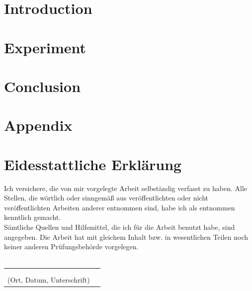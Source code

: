 \documentclass[a4paper,12pt,oneside]{article}
\begin{document}
    \newpage
    

    \tableofcontents
    
    \newpage
    \pagestyle{fancy}
    
    
    \listoffigures
    \newpage
    
    \listoftables
    \newpage
    
  
    
    \section{Introduction}\label{introduction}  
     
    \newpage

    \section{Experiment}
    
    \newpage
    
    \newpage
    
    \newpage
    
    \section{Conclusion}\label{conclusion}  
     
    
    

    \newpage
    \setcounter{section}{0} 
    \renewcommand*\thesection{\Alph{section}}

    \section{Appendix}\label{appendix}
    



    \newpage
        
    \pagestyle{empty}
    \section{Eidesstattliche Erklärung}
    
    Ich versichere, die von mir vorgelegte Arbeit selbständig verfasst zu haben.
    Alle Stellen, die wörtlich oder sinngemäß aus veröffentlichten oder nicht veröffentlichten Arbeiten anderer entnommen sind,
    habe ich als entnommen kenntlich gemacht.\\ 
    Sämtliche Quellen und Hilfsmittel, die ich für die Arbeit benutzt habe, sind
    angegeben. Die Arbeit hat mit gleichem Inhalt bzw. in wesentlichen Teilen noch keiner anderen Prüfungsbehörde vorgelegen.\\\\
    \begin{tabular}{cp{7cm}}
    & \\ 
    & \\ \hline
    \small (Ort, Datum, Unterschrift) & \normalsize \\
    \end{tabular}
    
    
    \newpage
    \printbibliography

    \thispagestyle{empty}
    \newpage
\end{document}
